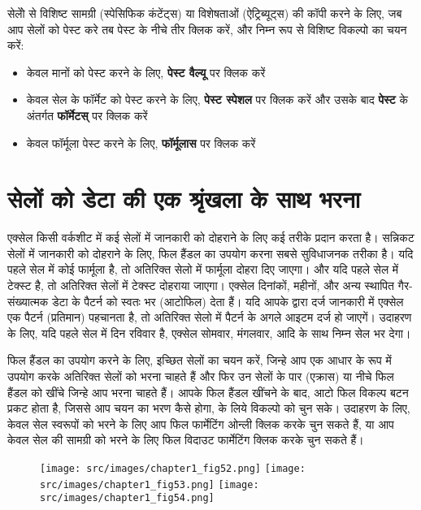 सेलोें से विशिष्ट सामग्री (स्पेसिफिक कंटेंट्स) या विशेषताओं (ऐट्रिब्यूट्स) की कॉपी करने के लिए, जब आप सेलों को पेस्ट करे तब पेस्ट के नीचे तीर क्लिक करें, और निम्न रूप से विशिष्ट विकल्पो का चयन करें:

\begin{itemize}[topsep=-1ex,parsep=0ex,partopsep=0ex,itemsep=0.5ex]
\item केवल मानों को पेस्ट करने के लिए, \textbf{पेस्ट वैल्यू} पर क्लिक करें
\item केवल सेल के फॉर्मेट को पेस्ट करने के लिए, \textbf{पेस्ट स्पेशल} पर क्लिक करें और उसके बाद \textbf{पेस्ट} के अंतर्गत \textbf{फॉर्मेटस्} पर क्लिक करें
\item केवल फॉर्मूला पेस्ट करने के लिए, \textbf{फॉर्मूलास} पर क्लिक करें
\end{itemize}	
	
\section{सेलों को डेटा की एक श्रृंखला के साथ भरना}\label{id-1.34}

एक्सेल किसी वर्कशीट में कई सेलों में जानकारी को दोहराने के लिए कई तरीके प्रदान करता है। सन्निकट सेलों में जानकारी को दोहराने के लिए, फिल हैंडल का उपयोग करना सबसे सुविधाजनक तरीका है। यदि पहले सेल में कोई फार्मूला है, तो अतिरिक्त सेलो में फार्मूला दोहरा दिए जाएगा। और यदि पहले सेल में टेक्स्ट है, तो अतिरिक्त सेलों में टेक्स्ट दोहराया जाएगा। एक्सेल दिनांकों, महीनों, और अन्य स्थापित गैर-संख्यात्मक डेटा के पैटर्न को स्वतः भर (आटोफिल) देता हैं। यदि आपके द्वारा दर्ज जानकारी में एक्सेल एक पैटर्न (प्रतिमान) पहचानता है, तो अतिरिक्त सेलो में पैटर्न के अगले आइटम दर्ज हो जाएगें। उदाहरण के लिए, यदि पहले सेल में दिन रविवार है, एक्सेल सोमवार, मंगलवार, आदि के साथ निम्न सेल भर देगा।


फिल हैंडल का उपयोग करने के लिए, इच्छित सेलों का चयन करें, जिन्हे आप एक आधार के रूप में उपयोग करके अतिरिक्त सेलों को भरना चाहते हैं और फिर उन सेलों के पार (एक्रास) या नीचे फिल हैंडल को खींचे जिन्हे आप भरना चाहते हैं। आपके फिल हैंडल खींचने के बाद, आटो फिल विकल्प बटन प्रकट होता है, जिससे आप चयन का भरण कैसे होगा, के लिये विकल्पो को चुन सके। उदाहरण के लिए, केवल सेल स्वरूपों को भरने के लिए आप फिल फार्मेटिंग ओन्ली क्लिक करके चुन सकते हैं, या आप केवल सेल की सामग्री को भरने के लिए फिल विदाउट फार्मेटिंग क्लिक करके चुन सकते हैं।
				
\begin{figure}[t]
\centering
\texttt{[image: src/images/chapter1\_fig52.png]}\quad
\texttt{[image: src/images/chapter1\_fig53.png]}\quad
\texttt{[image: src/images/chapter1\_fig54.png]}
\end{figure}

